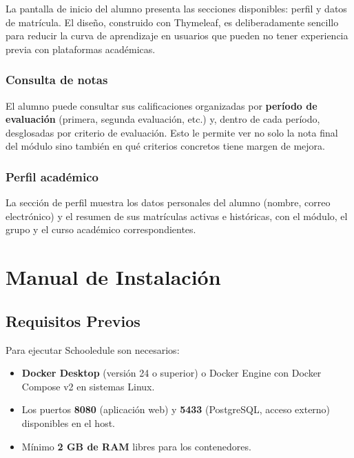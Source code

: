 \documentclass[12pt, a4paper]{report}
\begin{document}
La pantalla de inicio del alumno presenta las secciones disponibles: perfil y
datos de matrícula. El diseño, construido con Thymeleaf, es deliberadamente
sencillo para reducir la curva de aprendizaje en usuarios que pueden no tener experiencia
previa con plataformas académicas.


\subsection{Consulta de notas}

El alumno puede consultar sus calificaciones organizadas por \textbf{período de
evaluación} (primera, segunda evaluación, etc.) y, dentro de cada período, desglosadas
por criterio de evaluación. Esto le permite ver no solo la nota final del módulo sino
también en qué criterios concretos tiene margen de mejora.


\subsection{Perfil académico}

La sección de perfil muestra los datos personales del alumno (nombre, correo electrónico)
y el resumen de sus matrículas activas e históricas, con el módulo, el grupo y el curso
académico correspondientes.


\chapter{Manual de Instalación}

\section{Requisitos Previos}

Para ejecutar Schooledule son necesarios:

\begin{itemize}
  \item \textbf{Docker Desktop} (versión 24 o superior) o Docker Engine con
        Docker Compose v2 en sistemas Linux.
  \item Los puertos \textbf{8080} (aplicación web) y \textbf{5433}
        (PostgreSQL, acceso externo) disponibles en el host.
  \item Mínimo \textbf{2 GB de RAM} libres para los contenedores.
\end{itemize}
\end{document}
